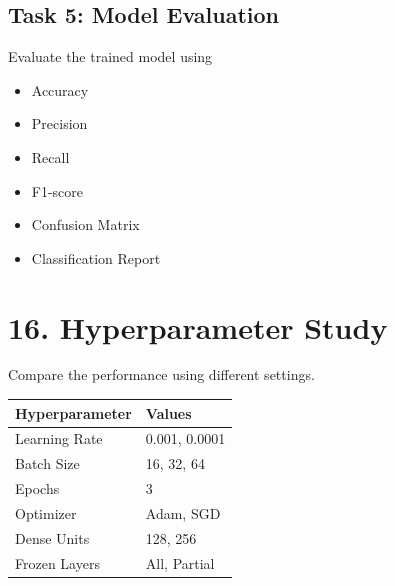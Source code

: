 \documentclass[11pt]{article}
\begin{document}

\subsection*{Task 5: Model Evaluation}

Evaluate the trained model using

\begin{itemize}

\item Accuracy

\item Precision

\item Recall

\item F1-score

\item Confusion Matrix

\item Classification Report

\end{itemize}


\section*{16. Hyperparameter Study}

Compare the performance using different settings.

\begin{center}

\begin{tabular}{|l|l|}

\hline

Hyperparameter & Values\\

\hline

Learning Rate &
0.001, 0.0001\\

\hline

Batch Size &
16, 32, 64\\

\hline

Epochs &
3\\

\hline

Optimizer &
Adam, SGD\\

\hline

Dense Units &
128, 256\\

\hline

Frozen Layers &
All, Partial\\

\hline

\end{tabular}

\end{center}
\end{document}
